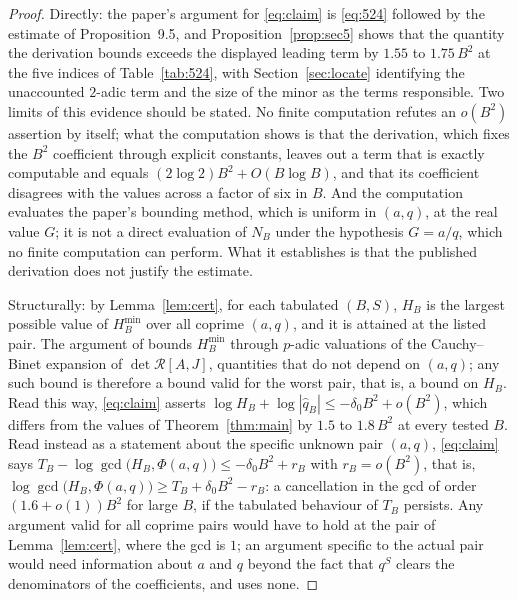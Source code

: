\documentclass[11pt]{amsart}
\theoremstyle{definition}
\newcommand{\qhat}{\widehat{q}}
\begin{document}
\begin{proof}
Directly: the paper's argument for \eqref{eq:claim} is \eqref{eq:524} followed by the estimate of
Proposition~9.5, and Proposition~\ref{prop:sec5} shows that the quantity the derivation bounds exceeds the displayed leading term by $1.55$ to $1.75\,B^2$ at the five indices of Table~\ref{tab:524}, with Section~\ref{sec:locate} identifying the
unaccounted $2$-adic term and the size of the minor as the terms responsible. Two limits of this evidence should
be stated. No finite computation refutes an $o(B^2)$ assertion by itself; what the computation shows is that the
derivation, which fixes the $B^2$ coefficient through explicit constants, leaves out a term that is exactly
computable and equals $(2\log2)B^2+O(B\log B)$, and that its coefficient disagrees with the values across a
factor of six in $B$. And the computation evaluates the paper's bounding method, which is uniform in $(a,q)$,
at the real value $G$; it is not a direct evaluation of $N_B$ under the hypothesis $G=a/q$, which no finite
computation can perform. What it establishes is that the published derivation does not justify the estimate.

Structurally: by Lemma~\ref{lem:cert}, for each tabulated $(B,S)$, $H_B$ is the largest possible value of $H_B^{\min}$ over all coprime $(a,q)$, and it is attained at the listed pair. The
argument of \cite[\S\S4--9]{Sun26} bounds $H_B^{\min}$ through $p$-adic valuations of the Cauchy--Binet
expansion of $\det\mathcal R[A,J]$, quantities that do not depend on $(a,q)$; any such bound is therefore a
bound valid for the worst pair, that is, a bound on $H_B$. Read this way, \eqref{eq:claim} asserts
$\log H_B+\log|\qhat_B|\le-\delta_0B^2+o(B^2)$, which differs from the values of Theorem~\ref{thm:main} by $1.5$ to $1.8\,B^2$
at every tested $B$. Read instead as a statement about the specific unknown pair $(a,q)$, \eqref{eq:claim} says $T_B-\log\gcd\bigl(H_B,\Phi(a,q)\bigr)\le-\delta_0B^2+r_B$ with $r_B=o(B^2)$, that is, $\log\gcd\bigl(H_B,\Phi(a,q)\bigr)\ge T_B+\delta_0B^2-r_B$: a cancellation in the gcd of order $(1.6+o(1))B^2$ for large $B$, if the tabulated behaviour of $T_B$ persists. Any
argument valid for all coprime pairs would have to hold at the pair of Lemma~\ref{lem:cert}, where the gcd is
$1$; an argument specific to the actual pair would need information about $a$ and $q$ beyond the fact that
$q^S$ clears the denominators of the coefficients, and \cite{Sun26} uses none.
\end{proof}
\end{document}
